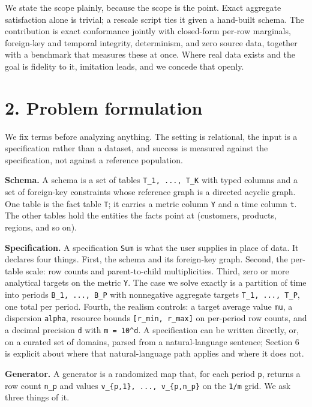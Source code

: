 We state the scope plainly, because the scope is the point. Exact
aggregate satisfaction alone is trivial; a rescale script ties it given
a hand-built schema. The contribution is exact conformance jointly with
closed-form per-row marginals, foreign-key and temporal integrity,
determinism, and zero source data, together with a benchmark that
measures these at once. Where real data exists and the goal is fidelity
to it, imitation leads, and we concede that openly.

\hypertarget{problem-formulation}{%
\section{2. Problem formulation}\label{problem-formulation}}

We fix terms before analyzing anything. The setting is relational, the
input is a specification rather than a dataset, and success is measured
against the specification, not against a reference population.

\textbf{Schema.} A schema is a set of tables \texttt{T\_\allowbreak{}1,\ ...,\ T\_\allowbreak{}K}
with typed columns and a set of foreign-key constraints whose reference
graph is a directed acyclic graph. One table is the fact table
\texttt{T}; it carries a metric column \texttt{Y} and a time column
\texttt{t}. The other tables hold the entities the facts point at
(customers, products, regions, and so on).

\textbf{Specification.} A specification \texttt{Sum} is what the user
supplies in place of data. It declares four things. First, the schema
and its foreign-key graph. Second, the per-table scale: row counts and
parent-to-child multiplicities. Third, zero or more analytical targets
on the metric \texttt{Y}. The case we solve exactly is a partition of
time into periods \texttt{B\_\allowbreak{}1,\ ...,\ B\_\allowbreak{}P} with nonnegative aggregate
targets \texttt{T\_\allowbreak{}1,\ ...,\ T\_\allowbreak{}P}, one total per period. Fourth, the
realism controls: a target average value \texttt{mu}, a dispersion
\texttt{alpha}, resource bounds \texttt{{[}r\_\allowbreak{}min,\ r\_\allowbreak{}max{]}} on
per-period row counts, and a decimal precision \texttt{d} with
\texttt{m\ =\ 10\^{}d}. A specification can be written directly, or, on
a curated set of domains, parsed from a natural-language sentence;
Section 6 is explicit about where that natural-language path applies and
where it does not.

\textbf{Generator.} A generator is a randomized map that, for each
period \texttt{p}, returns a row count \texttt{n\_\allowbreak{}p} and values
\texttt{v\_\allowbreak{}\{p,1\},\ ...,\ v\_\allowbreak{}\{p,n\_\allowbreak{}p\}} on the \texttt{1/\allowbreak{}m} grid. We
ask three things of it.

